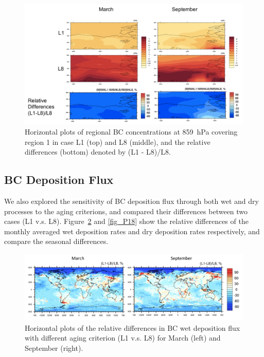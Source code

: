 \documentclass[12pt, fullpage]{uiucthesis2009}
\begin{document}
	
	\begin{figure}[h] 
		\begin{center}
			\includegraphics[width = 1\textwidth]{Figure20}
			\caption[Horizontal plots of regional BC concentrations at 859~hPa covering region 1 in case L1 (top) and L8 (middle), and the relative differences (bottom) denoted by (L1 - L8)/L8]{\label{fig_P20} Horizontal plots of regional BC concentrations at 859~hPa covering region 1 in case L1 (top) and L8 (middle), and the relative differences (bottom) denoted by (L1 - L8)/L8.}
		\end{center}
	\end{figure}
	
	\subsection{BC Deposition Flux}
	We also explored the sensitivity of BC deposition flux through both wet and dry processes to the aging criterions, and compared their differences between two cases (L1 v.s. L8). Figure~\ref{fig_P17} and \ref{fig_P18} show the relative differences of the monthly averaged wet deposition rates and dry deposition rates respectively, and compare the seasonal differences. 
	
	\begin{figure}[h] 
		\begin{center}
			\includegraphics[width = 1\textwidth]{Figure17}
			\caption[Horizontal plots of the relative differences in BC wet deposition flux with different aging criterion (L1 v.s. L8) for March (left) and September (right).]{\label{fig_P17} Horizontal plots of the relative differences in BC wet deposition flux with different aging criterion (L1 v.s. L8) for March (left) and September (right).}
		\end{center}
	\end{figure}
	
\end{document}
